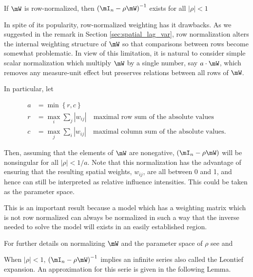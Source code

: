 \documentclass[english,12pt]{book}\usepackage[]{graphicx}\usepackage[]{xcolor}
\begin{document}
\begin{theorem}
If $\mW$ is row-normalized, then  $\left(\mI_n - \rho\mW\right)^{-1}$ exists for all $\left|\rho \right| < 1$
\end{theorem}

In spite of its popularity, row-normalized weighting has it drawbacks. As we suggested in the remark in Section \ref{sec:spatial_lag_var}, row normalization alters the internal weighting structure of $\mW$ so that comparisons between rows become somewhat problematic. In view of this limitation, it is natural to consider simple scalar normalization which multiply $\mW$ by a single number, say $a \cdot \mW$, which removes any measure-unit effect but preserves relations between all rows of $\mW$. 

In particular, let

\begin{equation*}
  \begin{aligned}
    a & = \min \left\lbrace r, c \right\rbrace \\
    r & = \max_i \sum_j \left|w_{ij}\right|\quad \mbox{maximal row sum of the absolute values} \\
    c & = \max_j \sum_i \left|w_{ij}\right|\quad \mbox{maximal column sum of the absolute values}.
  \end{aligned}
\end{equation*}

Then, assuming that the elements of $\mW$ are nonegative, $(\mI_n - \rho\mW)$ will be nonsingular for all $\left|\rho\right| < 1/a$. Note that this normalization has the advantage of ensuring that the resulting spatial weights, $w_{ij}$, are all between 0 and 1, and hence can still be interpreted as relative influence intensities. This could be taken as the parameter space. 

This is an important result because a model which has a weighting matrix which is not row normalized can always be normalized in such a way that the inverse needed to solve the model will exists in an easily established region. 


\begin{remark}
For further details on normalizing $\mW$ and the parameter space of $\rho$ see \citet[][section 2.4]{elhorst2014spatial} and \citet[][section 2.2]{kelejian2010specification}
\end{remark}

When $\left|\rho\right|< 1$, $\left(\mI_n - \rho\mW\right)^{-1}$ implies an infinite series also called the Leontief expansion. An approximation for this serie is given in the following Lemma.
\end{document}
